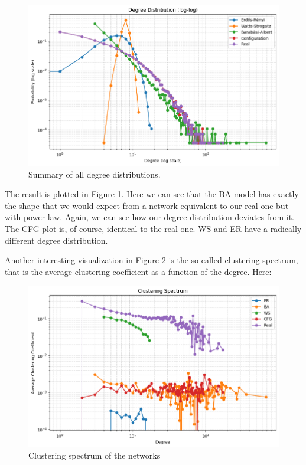\documentclass[12pt]{article}
\begin{document}
\begin{figure}[h]
	\centering
	\includegraphics[width=0.6\linewidth]{screenshot015}
	\caption{Summary of all degree distributions.}
	\label{fig:screenshot015}
\end{figure}
The result is plotted in Figure \ref{fig:screenshot015}. Here we can see that the BA model has exactly the shape that we would expect from a network equivalent to our real one but with power law. Again, we can see how our degree distribution deviates from it. The CFG plot is, of course, identical to the real one. WS and ER have a radically different degree distribution.\par
Another interesting visualization in Figure \ref{fig:screenshot016} is the so-called clustering spectrum, that is the average clustering coefficient as a function of the degree. Here:
\begin{figure}[h]
	\centering
	\includegraphics[width=0.6\linewidth]{screenshot016}
	\caption{Clustering spectrum of the networks}
	\label{fig:screenshot016}
\end{figure}
\end{document}
